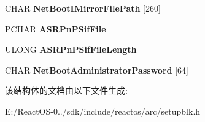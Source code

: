 \begin{DoxyCompactItemize}
\mbox{\label{struct___s_e_t_u_p___l_o_a_d_e_r___b_l_o_c_k_a8a1f33dba79cdb4fd2d92641b48df8ef}} 
C\+H\+AR {\bfseries Net\+Boot\+I\+Mirror\+File\+Path} \mbox{[}260\mbox{]}
\item 
\mbox{\label{struct___s_e_t_u_p___l_o_a_d_e_r___b_l_o_c_k_a82713a3ee8cc7ba03245740aabcfe420}} 
P\+C\+H\+AR {\bfseries A\+S\+R\+Pn\+P\+Sif\+File}
\item 
\mbox{\label{struct___s_e_t_u_p___l_o_a_d_e_r___b_l_o_c_k_a9772339bab744e37065da53af552cf38}} 
U\+L\+O\+NG {\bfseries A\+S\+R\+Pn\+P\+Sif\+File\+Length}
\item 
\mbox{\label{struct___s_e_t_u_p___l_o_a_d_e_r___b_l_o_c_k_a7414afdf36e9c202154e0329bee6d34b}} 
C\+H\+AR {\bfseries Net\+Boot\+Administrator\+Password} \mbox{[}64\mbox{]}
\end{DoxyCompactItemize}


该结构体的文档由以下文件生成\+:\begin{DoxyCompactItemize}
\item 
E\+:/\+React\+O\+S-\/0../sdk/include/reactos/arc/setupblk.\+h\end{DoxyCompactItemize}
